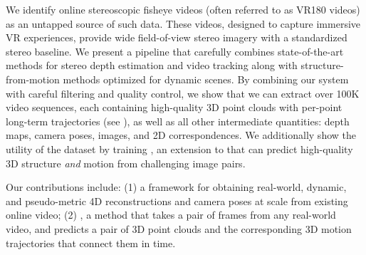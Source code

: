 We identify online stereoscopic fisheye videos (often referred to as VR180 videos) as an untapped source of such data. 
These videos, designed to capture immersive VR experiences, provide wide field-of-view stereo imagery with a standardized stereo baseline. We present a pipeline that carefully combines state-of-the-art methods for stereo depth estimation and video tracking along with
structure-from-motion methods optimized for dynamic scenes. By combining our system with careful filtering and quality control, we show that we can extract over 100K video sequences, each containing high-quality 3D point clouds with per-point long-term trajectories (see ), as well as all other intermediate quantities: depth maps, camera poses, images, and 2D correspondences. 
We additionally show the utility of the dataset by training \emph{\method}, an extension to \duster that can predict high-quality 3D structure {\it and} motion from challenging image pairs. 

Our contributions include: (1) a framework for obtaining real-world, dynamic, and pseudo-metric 4D reconstructions and camera poses at scale from existing online video; (2) \method, a method that takes a pair of frames from any real-world video, and predicts a pair of 3D point clouds and the corresponding 3D motion trajectories that connect them in time. 
